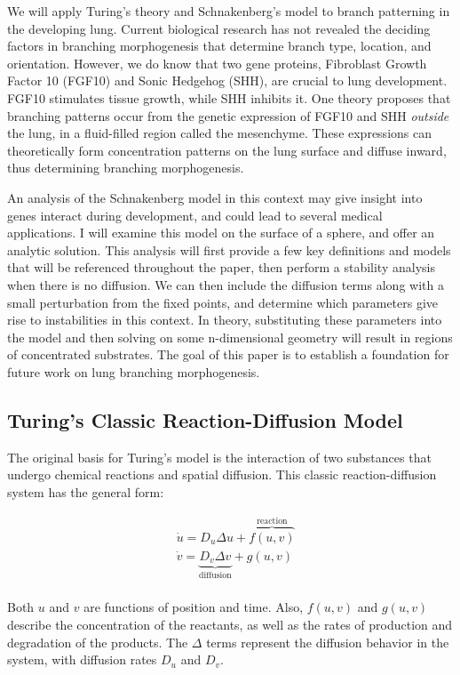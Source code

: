 \documentclass[12pt]{article}
\begin{document}
We will apply Turing's theory and Schnakenberg's model to branch patterning in the developing lung. Current biological research has not revealed the deciding factors in branching morphogenesis that determine branch type, location, and orientation.\cite{Menshykau2012} However, we do know that two gene proteins, Fibroblast Growth Factor 10 (FGF10) and Sonic Hedgehog (SHH), are crucial to lung development.\cite{Schittny2017} FGF10 stimulates tissue growth, while SHH inhibits it. One theory proposes that branching patterns occur from the genetic expression of FGF10 and SHH {\it outside} the lung, in a fluid-filled region called the mesenchyme.\cite{Roth-Kleiner2003} These expressions can theoretically form concentration patterns on the lung surface and diffuse inward, thus determining branching morphogenesis.

An analysis of the Schnakenberg model in this context may give insight into genes interact during development, and could lead to several medical applications. I will examine this model on the surface of a sphere, and offer an analytic solution. This analysis will first provide a few key definitions and models that will be referenced throughout the paper, then perform a stability analysis when there is no diffusion. We can then include the diffusion terms along with a small perturbation from the fixed points, and determine which parameters give rise to instabilities in this context. In theory, substituting these parameters into the model and then solving on some n-dimensional geometry will result in regions of concentrated substrates. The goal of this paper is to establish a foundation for future work on lung branching morphogenesis. 

\subsection{Turing's Classic Reaction-Diffusion Model}\label{classic_model}

The original basis for Turing's model is the interaction of two substances that undergo chemical reactions and spatial diffusion. This classic reaction-diffusion system has the general form:

\begin{equation}
\label{eq:classic}
    \begin{aligned}
    &\dot{u}=D_u\Delta u+\overbrace{f(u,v)}^\text{reaction} \\
    &\dot{v}=\underbrace{D_v\Delta v}_\text{diffusion}+g(u,v)
    \end{aligned}
\end{equation}
\\
\noindent Both $u$ and $v$ are functions of position and time. Also, $f(u,v)$ and $g(u,v)$ describe the concentration of the reactants, as well as the rates of production and degradation of the products. The $\Delta$ terms represent the diffusion behavior in the system, with diffusion rates $D_u$ and $D_v$. 
\end{document}
